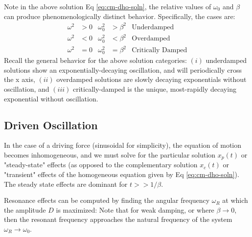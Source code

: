 Note in the above solution Eq \ref{eq:cm-dho-soln}, the relative values of $\omega_0$ and $\beta$ can produce phenomenologically distinct behavior. Specifically, the cases are:
\begin{subequations}
\begin{align}
		\omega^2 &> 0 & \omega_0^2 &> \beta^2 & \text{Underdamped} \\
		\omega^2 &< 0 & \omega_0^2 &< \beta^2 & \text{Overdamped} \\
		\omega^2 &= 0 & \omega_0^2 &= \beta^2 & \text{Critically Damped} 
\end{align}	
\end{subequations}
Recall the general behavior for the above solution categories: $(i)$ underdamped solutions show an exponentially-decaying oscillation, and will periodically cross the x axis, $(ii)$ overdamped solutions are slowly decaying exponentials without oscillation, and $(iii)$ critically-damped is the unique, most-rapidly decaying exponential without oscillation.\\


\subsection{Driven Oscillation}
In the case of a driving force (sinusoidal for simplicity), the equation of motion becomes inhomogeneous, and we must solve for the particular solution $x_p(t)$ or "steady-state" effects (as opposed to the complementary solution $x_c(t)$ or "transient" effects of the homogeneous equation given by Eq \ref{eq:cm-dho-soln}). The steady state effects are dominant for $t >> 1/\beta$. 


Resonance effects can be computed by finding the angular frequency $\omega_R$ at which the amplitude $D$ is maximized:
Note that for weak damping, or where $\beta \rightarrow 0$, then the resonant frequency approaches the natural frequency of the system $\omega_R \rightarrow \omega_0$. 
\\


